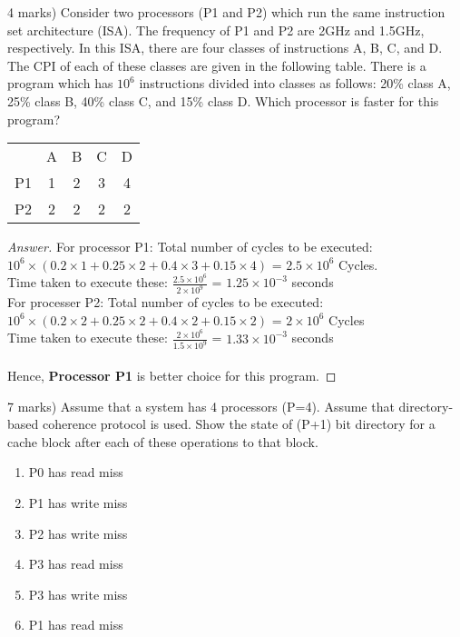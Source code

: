 \documentclass[12pt]{article}
\newenvironment{exercise}[2][Exercise]{\begin{trivlist}
\item[\hskip \labelsep {\bfseries #1}\hskip \labelsep {\bfseries #2.}]}{\end{trivlist}}
\begin{document}
\begin{exercise}[Question]{4}
(4 marks) Consider two processors (P1 and P2) which run the same instruction
set architecture (ISA). The frequency of P1 and P2 are 2GHz and 1.5GHz,
respectively.
In this ISA, there are four classes of instructions A, B, C, and D. The CPI of each of
these classes are given in the following table.
There is a program which has $10^{6}$ instructions divided into classes as follows: 20\%
class A, 25\% class B, 40\% class C, and 15\% class D. Which processor is faster for
this program?\\
\begin{center}
\begin{tabular}{|| c | c | c | c | c ||} \hline
& A & B & C & D \\
P1 & 1 & 2 & 3 & 4 \\
P2 & 2 & 2 & 2 & 2 \\ \hline
\end{tabular}
\end{center}
\end{exercise}
\begin{proof}[Answer] 
	For processor P1: Total number of cycles to be executed: $10^{6} \times (0.2\times1 + 0.25\times2 + 0.4\times3 + 0.15\times4)$ = $2.5 \times 10^{6}$ Cycles. \\
Time taken to execute these: $\frac{2.5 \times 10^{6}}{ 2 \times 10^{9}}$ = $1.25 \times 10^{-3}$ seconds \\

For processer P2: Total number of cycles to be executed: $10^{6} \times (0.2\times 2 + 0.25\times 2 + 0.4 \times 2 + 0.15 \times 2)$ = $2 \times 10^{6} $ Cycles \\
Time taken to execute these: $\frac{2 \times 10^{6}}{1.5 \times 10^{9}} $ = $1.33 \times 10^{-3}$ seconds
\\
\\ Hence, \textbf{Processor P1} is better choice for this program.

\end{proof}

 
\begin{exercise}[Question]{5}
(7 marks) Assume that a system has 4 processors (P=4). Assume that directory-
based coherence protocol is used. Show the state of (P+1) bit directory for a cache block after each of these operations to that block.

\renewcommand{\theenumi}{\roman{enumi}}
\begin{enumerate}
\item P0 has read miss
\item P1 has write miss
\item P2 has write miss
\item P3 has read miss
\item P3 has write miss
\item P1 has read miss
\end{enumerate}
\end{exercise}
\end{document}
